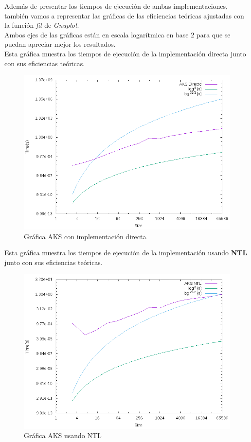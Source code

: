 Además de presentar los tiempos de ejecución de ambas implementaciones, también vamos a representar las gráficas de las eficiencias teóricas ajustadas con la función \textit{fit} de \textit{Gnuplot}.\\

Ambos ejes de las gráficas están en escala logarítmica en base $2$ para que se puedan apreciar mejor los resultados.\\

Esta gráfica muestra los tiempos de ejecución de la implementación directa junto con sus eficiencias teóricas.

\begin{figure}[H]
	\centering
	\includegraphics[totalheight=12cm]{img/graphs/aks-direct-mean}
	\caption{Gráfica AKS con implementación directa}
\end{figure}

Esta gráfica muestra los tiempos de ejecución de la implementación usando \textbf{NTL} junto con sus eficiencias teóricas.

\begin{figure}[H]
	\centering
	\includegraphics[totalheight=12cm]{img/graphs/aks-ntl-mean}
	\caption{Gráfica AKS usando NTL}
\end{figure}

